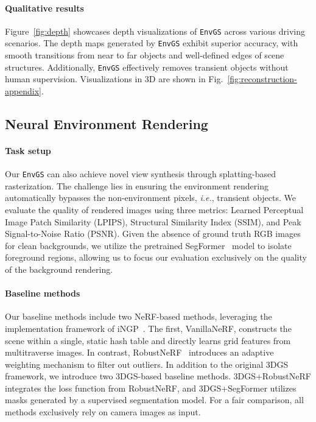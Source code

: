 \paragraph{Qualitative results} Figure~\ref{fig:depth} showcases depth visualizations of \texttt{EnvGS} across various driving scenarios. The depth maps generated by \texttt{EnvGS} exhibit superior accuracy, with smooth transitions from near to far objects and well-defined edges of scene structures. Additionally, \texttt{EnvGS} effectively removes transient objects without human supervision. Visualizations in 3D are shown in Fig.~\ref{fig:reconstruction-appendix}. 




\subsection{Neural Environment Rendering}

\paragraph{Task setup}
Our \texttt{EnvGS} can also achieve novel view synthesis through splatting-based rasterization. The challenge lies in ensuring the environment rendering automatically bypasses the non-environment pixels, \textit{i.e.}, transient objects.
We evaluate the quality of rendered images using three metrics: Learned Perceptual Image Patch Similarity (LPIPS), Structural Similarity Index (SSIM), and Peak Signal-to-Noise Ratio (PSNR). Given the absence of ground truth RGB images for clean backgrounds, we utilize the pretrained SegFormer~\cite{xie2021segformer} model to isolate foreground regions, allowing us to focus our evaluation exclusively on the quality of the background rendering.


\paragraph{Baseline methods} Our baseline methods include two NeRF-based methods, leveraging the implementation framework of iNGP~\cite{muller2022instant}. The first, VanillaNeRF, constructs the scene within a single, static hash table and directly learns grid features from multitraverse images. In contrast, RobustNeRF~\cite{sabour2023robustnerf} introduces an adaptive weighting mechanism to filter out outliers. In addition to the original 3DGS framework, we introduce two 3DGS-based baseline methods. 3DGS+RobustNeRF integrates the loss function from RobustNeRF, and 3DGS+SegFormer utilizes masks generated by a supervised segmentation model. For a fair comparison, all methods exclusively rely on camera images as input.

